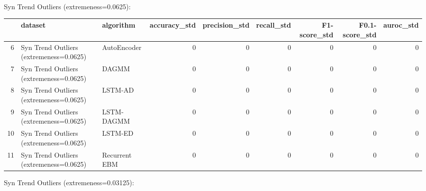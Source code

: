 Syn Trend Outliers (extremeness=0.0625):

\begin{tabular}{rllrrrrrr}
\hline
    & dataset                                 & algorithm     &   accuracy\_std &   precision\_std &   recall\_std &   F1-score\_std &   F0.1-score\_std &   auroc\_std \\
\hline
  6 & Syn Trend Outliers (extremeness=0.0625) & AutoEncoder   &              0 &               0 &            0 &              0 &                0 &           0 \\
  7 & Syn Trend Outliers (extremeness=0.0625) & DAGMM         &              0 &               0 &            0 &              0 &                0 &           0 \\
  8 & Syn Trend Outliers (extremeness=0.0625) & LSTM-AD       &              0 &               0 &            0 &              0 &                0 &           0 \\
  9 & Syn Trend Outliers (extremeness=0.0625) & LSTM-DAGMM    &              0 &               0 &            0 &              0 &                0 &           0 \\
 10 & Syn Trend Outliers (extremeness=0.0625) & LSTM-ED       &              0 &               0 &            0 &              0 &                0 &           0 \\
 11 & Syn Trend Outliers (extremeness=0.0625) & Recurrent EBM &              0 &               0 &            0 &              0 &                0 &           0 \\
\hline
\end{tabular}

Syn Trend Outliers (extremeness=0.03125):

